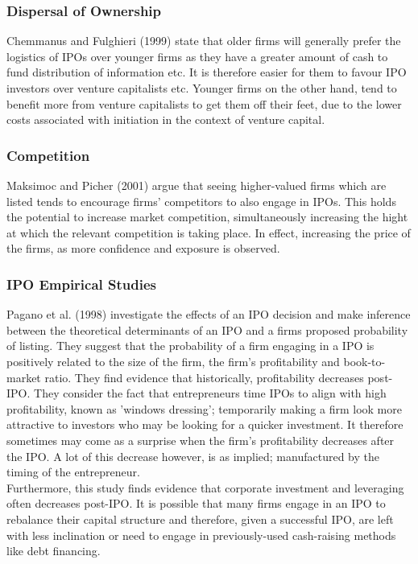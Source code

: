 \documentclass[11pt, english]{article}
\begin{document}
		\subsubsection*{Dispersal of Ownership}

	Chemmanus and Fulghieri (1999) state that older firms will generally prefer the logistics of IPOs over younger firms as they have a greater amount of cash to fund distribution of information etc. It is therefore easier for them to favour IPO investors over venture capitalists etc. Younger firms on the other hand, tend to benefit more from venture capitalists to get them off their feet, due to the lower costs associated with initiation in the context of venture capital.

		\subsubsection*{Competition}

	Maksimoc and Picher (2001) argue that seeing higher-valued firms which are listed tends to encourage firms' competitors to also engage in IPOs. This holds the potential to increase market competition, simultaneously increasing the hight at which the relevant competition is taking place. In effect, increasing the price of the firms, as more confidence and exposure is observed.

		\subsubsection*{IPO Empirical Studies}

	Pagano et al. (1998) investigate the effects of an IPO decision and make inference between the theoretical determinants of an IPO and a firms proposed probability of listing. They suggest that the probability of a firm engaging in a IPO is positively related to the size of the firm, the firm's profitability and book-to-market ratio. They find evidence that historically, profitability decreases post-IPO. They consider the fact that entrepreneurs time IPOs to align with high profitability, known as 'windows dressing'; temporarily making a firm look more attractive to investors who may be looking for a quicker investment. It therefore sometimes may come as a surprise when the firm's profitability decreases after the IPO. A lot of this decrease however, is as implied; manufactured by the timing of the entrepreneur.\\

	Furthermore, this study finds evidence that corporate investment and leveraging often decreases post-IPO. It is possible that many firms engage in an IPO to rebalance their capital structure and therefore, given a successful IPO, are left with less inclination or need to engage in previously-used cash-raising methods like debt financing.\\
\end{document}
